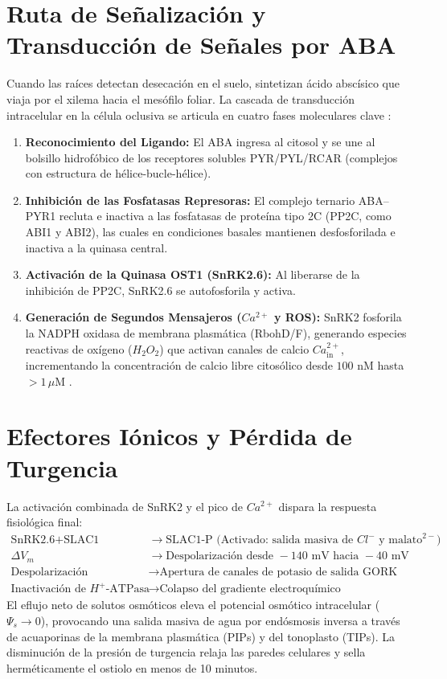 \documentclass[12pt,spanish,letterpaper,oneside]{article}
\begin{document}
\section{Ruta de Señalización y Transducción de Señales por ABA}
Cuando las raíces detectan desecación en el suelo, sintetizan ácido abscísico que viaja por el xilema hacia el mesófilo foliar. La cascada de transducción intracelular en la célula oclusiva se articula en cuatro fases moleculares clave \parencite{lodish2016}:
\begin{enumerate}
    \item \textbf{Reconocimiento del Ligando:} El ABA ingresa al citosol y se une al bolsillo hidrofóbico de los receptores solubles PYR/PYL/RCAR (complejos con estructura de hélice-bucle-hélice).
    \item \textbf{Inhibición de las Fosfatasas Represoras:} El complejo ternario ABA--PYR1 recluta e inactiva a las fosfatasas de proteína tipo 2C (PP2C, como ABI1 y ABI2), las cuales en condiciones basales mantienen desfosforilada e inactiva a la quinasa central.
    \item \textbf{Activación de la Quinasa OST1 (SnRK2.6):} Al liberarse de la inhibición de PP2C, SnRK2.6 se autofosforila y activa.
    \item \textbf{Generación de Segundos Mensajeros ($Ca^{2+}$ y ROS):} SnRK2 fosforila la NADPH oxidasa de membrana plasmática (RbohD/F), generando especies reactivas de oxígeno ($H_2O_2$) que activan canales de calcio $Ca^{2+}_{\text{in}}$, incrementando la concentración de calcio libre citosólico desde $100\text{ nM}$ hasta $>1\,\mu\text{M}$ \parencite{karp2014}.
\end{enumerate}

\section{Efectores Iónicos y Pérdida de Turgencia}
La activación combinada de SnRK2 y el pico de $Ca^{2+}$ dispara la respuesta fisiológica final:
\begin{align}
    \text{SnRK2.6} + \text{SLAC1} &\longrightarrow \text{SLAC1-P (Activado: salida masiva de } Cl^- \text{ y malato}^{2-}) \\
    \Delta V_m &\longrightarrow \text{Despolarización desde } -140\text{ mV} \text{ hacia } -40\text{ mV} \\
    \text{Despolarización} &\longrightarrow \text{Apertura de canales de potasio de salida GORK} \\
    \text{Inactivación de } H^+\text{-ATPasa} &\longrightarrow \text{Colapso del gradiente electroquímico}
\end{align}
El eflujo neto de solutos osmóticos eleva el potencial osmótico intracelular ($\Psi_s \to 0$), provocando una salida masiva de agua por endósmosis inversa a través de acuaporinas de la membrana plasmática (PIPs) y del tonoplasto (TIPs). La disminución de la presión de turgencia relaja las paredes celulares y sella herméticamente el ostiolo en menos de 10 minutos.
\end{document}
